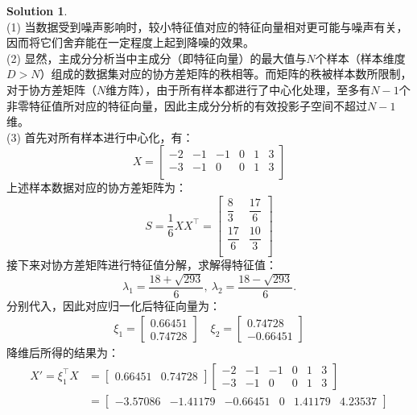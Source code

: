 \documentclass[a4paper,UTF8]{article}
\theoremstyle{definition}
\newtheorem*{solution}{Solution}
\begin{document}
\begin{solution}
~\\(1) 当数据受到噪声影响时，较小特征值对应的特征向量相对更可能与噪声有关，因而将它们舍弃能在一定程度上起到降噪的效果。
 \\(2) 显然，主成分分析当中主成分（即特征向量）的最大值与$N$个样本（样本维度$D>N$）组成的数据集对应的协方差矩阵的秩相等。而矩阵的秩被样本数所限制，对于协方差矩阵（$N$维方阵），由于所有样本都进行了中心化处理，至多有$N-1$个非零特征值所对应的特征向量，因此主成分分析的有效投影子空间不超过$N-1$维。
 \\(3) 首先对所有样本进行中心化，有：
 \begin{equation}\nonumber
	X=
 \left[
 \begin{array}{cccccc}
     -2 &-1 &-1 &0 &1 &3 \\
     -3 &-1 &0  &0 &1 &3 \\
 \end{array}
 \right]        
 \end{equation}
上述样本数据对应的协方差矩阵为：
\begin{equation}\nonumber
	S = \frac{1}{6}XX^{\top}=
 \left[
 \begin{array}{cc}
     \dfrac{8}{3}	&\dfrac{17}{6}\\[9pt]
     \dfrac{17}{6}	&\dfrac{10}{3}\\
 \end{array}
 \right]        
\end{equation}
接下来对协方差矩阵进行特征值分解，求解得特征值：$$\lambda_1 = \frac{18+\sqrt{293}}{6},\ \lambda_2 = \frac{18-\sqrt{293}}{6}.$$分别代入，因此对应归一化后特征向量为：
\begin{gather*}
\xi_1 = \begin{bmatrix} 0.66451 \\ 0.74728 \end{bmatrix}\quad
\xi_2 = \begin{bmatrix} 0.74728 \\ -0.66451 \end{bmatrix}
\end{gather*}
降维后所得的结果为：
\begin{equation}\nonumber
\begin{aligned}
	X' = \xi_1^{\top} X &= 
 \left[
 \begin{array}{cc}
 0.66451 & 0.74728
 \end{array} 
 \right]	
 \left[
 \begin{array}{cccccc}
     -2 &-1 &-1 &0 &1 &3 \\
     -3 &-1 &0  &0 &1 &3
 \end{array}
 \right]\\&=        
 \left[
 \begin{array}{cccccc}
     -3.57086 &-1.41179 &-0.66451 &0 &1.41179 &4.23537
 \end{array}\right]
\end{aligned}
\end{equation}
\end{solution}
\end{document}
